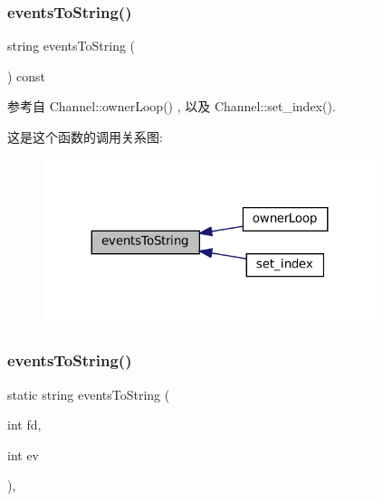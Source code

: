 \subsubsection{\texorpdfstring{events\+To\+String()}{eventsToString()}\hspace{0.1cm}{\footnotesize\ttfamily [1/2]}}
{\footnotesize\ttfamily string events\+To\+String (\begin{DoxyParamCaption}{ }\end{DoxyParamCaption}) const}



参考自 Channel\+::owner\+Loop() , 以及 Channel\+::set\+\_\+index().

这是这个函数的调用关系图\+:
\nopagebreak
\begin{figure}[H]
\begin{center}
\leavevmode
\includegraphics[width=275pt]{classmuduo_1_1net_1_1Channel_aebf2f9df0b2ab24a22a9e50d6f619a89_icgraph}
\end{center}
\end{figure}
\mbox{\label{classmuduo_1_1net_1_1Channel_a19a941214946dc266246c0050bb68636}} 
\subsubsection{\texorpdfstring{events\+To\+String()}{eventsToString()}\hspace{0.1cm}{\footnotesize\ttfamily [2/2]}}
{\footnotesize\ttfamily static string events\+To\+String (\begin{DoxyParamCaption}\item[{int}]{fd,  }\item[{int}]{ev }\end{DoxyParamCaption})\hspace{0.3cm}{\ttfamily [static]}, {\ttfamily [private]}}


